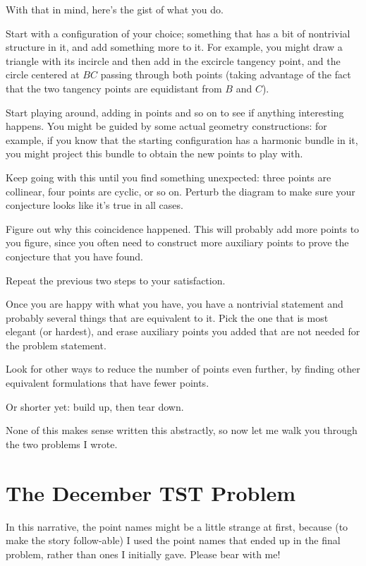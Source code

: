 \documentclass[11pt]{scrartcl}
\begin{document}
With that in mind, here's the gist of what you do.
\begin{enumerate}
  \ii Start with a configuration of your choice;
  something that has a bit of nontrivial structure in it,
  and add something more to it.
  For example, you might draw a triangle with its incircle
  and then add in the excircle tangency point,
  and the circle centered at $BC$ passing through both points
  (taking advantage of the fact that the two tangency points
  are equidistant from $B$ and $C$).

  \ii Start playing around, adding in points and so on
  to see if anything interesting happens.
  You might be guided by some actual geometry constructions:
  for example, if you know that the starting configuration
  has a harmonic bundle in it,
  you might project this bundle to obtain the new points to play with.

  \ii Keep going with this until you find something unexpected:
  three points are collinear, four points are cyclic, or so on.
  Perturb the diagram to make sure your conjecture looks like
  it's true in all cases.

  \ii Figure out why this coincidence happened.
  This will probably add more points to you figure,
  since you often need to construct more auxiliary points
  to prove the conjecture that you have found.

  \ii Repeat the previous two steps to your satisfaction.

  \ii Once you are happy with what you have,
  you have a nontrivial statement and probably
  several things that are equivalent to it.
  Pick the one that is most elegant (or hardest), and erase
  auxiliary points you added that are not needed for the
  problem statement.

  \ii Look for other ways to reduce the number of points
  even further, by finding other equivalent formulations
  that have fewer points.
\end{enumerate}
Or shorter yet: build up, then tear down.

None of this makes sense written this abstractly,
so now let me walk you through the two problems I wrote.

\eject

\section{The December TST Problem}
In this narrative, the point names might be a little strange at first,
because (to make the story follow-able) I used the point
names that ended up in the final problem,
rather than ones I initially gave.
Please bear with me!
\end{document}
